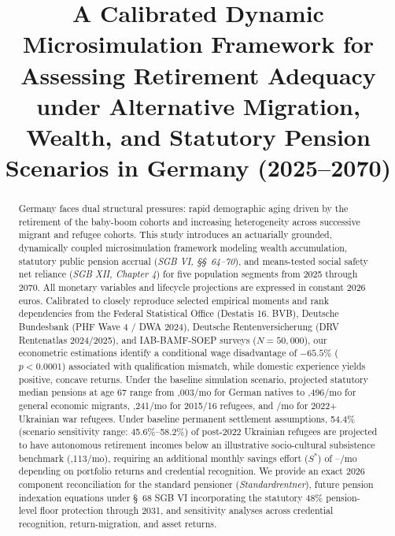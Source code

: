 \documentclass[conference]{IEEEtran}
\begin{document}
\title{A Calibrated Dynamic Microsimulation Framework for Assessing Retirement Adequacy under Alternative Migration, Wealth, and Statutory Pension Scenarios in Germany (2025--2070)}

\author{
}

\maketitle

\begin{abstract}
Germany faces dual structural pressures: rapid demographic aging driven by the retirement of the baby-boom cohorts and increasing heterogeneity across successive migrant and refugee cohorts. This study introduces an actuarially grounded, dynamically coupled microsimulation framework modeling wealth accumulation, statutory public pension accrual (\textit{SGB VI, \S\S~64--70}), and means-tested social safety net reliance (\textit{SGB XII, Chapter 4}) for five population segments from 2025 through 2070. All monetary variables and lifecycle projections are expressed in constant 2026 euros. Calibrated to closely reproduce selected empirical moments and rank dependencies from the Federal Statistical Office (Destatis 16. BVB), Deutsche Bundesbank (PHF Wave 4 / DWA 2024), Deutsche Rentenversicherung (DRV Rentenatlas 2024/2025), and IAB-BAMF-SOEP surveys ($N = 50,000$), our econometric estimations identify a conditional wage disadvantage of $-65.5\%$ ($p < 0.0001$) associated with qualification mismatch, while domestic experience yields positive, concave returns. Under the baseline simulation scenario, projected statutory median pensions at age 67 range from ,003/mo for German natives to ,496/mo for general economic migrants, ,241/mo for 2015/16 refugees, and /mo for 2022+ Ukrainian war refugees. Under baseline permanent settlement assumptions, 54.4\% (scenario sensitivity range: 45.6\%--58.2\%) of post-2022 Ukrainian refugees are projected to have autonomous retirement incomes below an illustrative socio-cultural subsistence benchmark (,113/mo), requiring an additional monthly savings effort ($S^*$) of --/mo depending on portfolio returns and credential recognition. We provide an exact 2026 component reconciliation for the standard pensioner (\textit{Standardrentner}), future pension indexation equations under \S~68 SGB VI incorporating the statutory 48\% pension-level floor protection through 2031, and sensitivity analyses across credential recognition, return-migration, and asset returns.
\end{abstract}
\end{document}
